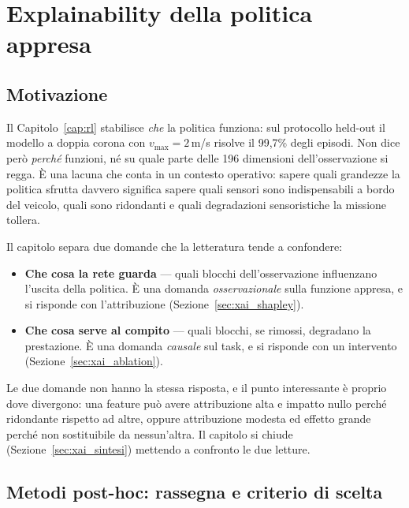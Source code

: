 \chapter{Explainability della politica appresa}
\label{cap:xai}

\section{Motivazione}
\label{sec:xai_motivazione}

Il Capitolo~\ref{cap:rl} stabilisce \emph{che} la politica funziona: sul protocollo
held-out il modello a doppia corona con $v_{\max}=2\,$m/s risolve il 99{,}7\% degli
episodi. Non dice per\`o \emph{perch\'e} funzioni, n\'e su quale parte delle 196
dimensioni dell'osservazione si regga. \`E una lacuna che conta in un contesto
operativo: sapere quali grandezze la politica sfrutta davvero significa sapere quali
sensori sono indispensabili a bordo del veicolo, quali sono ridondanti e quali
degradazioni sensoristiche la missione tollera.

Il capitolo separa due domande che la letteratura tende a confondere:

\begin{itemize}[leftmargin=1.4em, itemsep=2pt]
  \item \textbf{Che cosa la rete guarda} --- quali blocchi dell'osservazione
        influenzano l'uscita della politica. \`E una domanda \emph{osservazionale}
        sulla funzione appresa, e si risponde con l'attribuzione
        (Sezione~\ref{sec:xai_shapley}).
  \item \textbf{Che cosa serve al compito} --- quali blocchi, se rimossi, degradano
        la prestazione. \`E una domanda \emph{causale} sul task, e si risponde con
        un intervento (Sezione~\ref{sec:xai_ablation}).
\end{itemize}

Le due domande non hanno la stessa risposta, e il punto interessante \`e proprio
dove divergono: una feature pu\`o avere attribuzione alta e impatto nullo perch\'e
ridondante rispetto ad altre, oppure attribuzione modesta ed effetto grande perch\'e
non sostituibile da nessun'altra. Il capitolo si chiude
(Sezione~\ref{sec:xai_sintesi}) mettendo a confronto le due letture.

\section{Metodi post-hoc: rassegna e criterio di scelta}
\label{sec:xai_rassegna}

